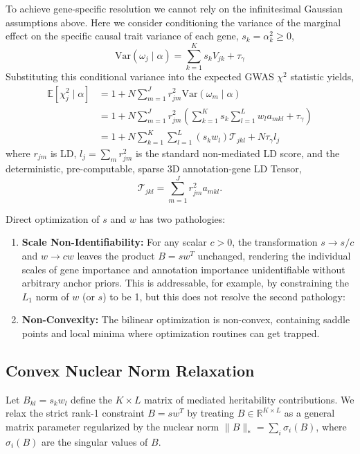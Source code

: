 \documentclass[11pt]{article}
\begin{document}
To achieve gene-specific resolution we cannot rely on the infinitesimal Gaussian assumptions above. Here we consider conditioning the variance of the marginal effect on the specific causal trait variance of each gene, $s_k = \alpha_k^2 \ge 0$,
\begin{equation}
    \text{Var}(\omega_j \mid \alpha) = \sum_{k=1}^K s_k V_{jk} + \tau_\gamma
\end{equation}
Substituting this conditional variance into the expected GWAS $\chi^2$ statistic yields,
\begin{align}
    \mathbb{E}[\chi_j^2 \mid \alpha] &= 1 + N \sum_{m=1}^J r_{jm}^2 \text{Var}(\omega_m \mid \alpha) \nonumber \\
    &= 1 + N \sum_{m=1}^J r_{jm}^2 \left( \sum_{k=1}^K s_k \sum_{l=1}^L w_l a_{mkl} + \tau_\gamma \right) \nonumber \\
    &= 1 + N \sum_{k=1}^K \sum_{l=1}^L (s_k w_l) \mathcal{T}_{jkl} + N \tau_\gamma l_j
\end{align}
where $r_{jm}$ is LD, $l_j = \sum_m r_{jm}^2$ is the standard non-mediated LD score, and the deterministic, pre-computable, sparse 3D annotation-gene LD Tensor,
\begin{equation}
    \mathcal{T}_{jkl} = \sum_{m=1}^J r_{jm}^2 a_{mkl}.
\end{equation}

Direct optimization of $s$ and $w$ has two pathologies:
\begin{enumerate}
    \item \textbf{Scale Non-Identifiability:} For any scalar $c > 0$, the transformation $s \to s/c$ and $w \to c w$ leaves the product $B = s w^T$ unchanged, rendering the individual scales of gene importance and annotation importance unidentifiable without arbitrary anchor priors. This is addressable, for example, by constraining the $L_1$ norm of $w$ (or $s$) to be 1, but this does not resolve the second pathology: 
    \item \textbf{Non-Convexity:} The bilinear optimization is non-convex, containing saddle points and local minima where optimization routines can get trapped.
\end{enumerate}


\subsection{Convex Nuclear Norm Relaxation}

Let $B_{kl} = s_k w_l$ define the $K \times L$ matrix of mediated heritability contributions. We relax the strict rank-1 constraint $B = s w^T$ by treating $B \in \mathbb{R}^{K \times L}$ as a general matrix parameter regularized by the nuclear norm $\|B\|_* = \sum_i \sigma_i(B)$, where $\sigma_i(B)$ are the singular values of $B$.
\end{document}
